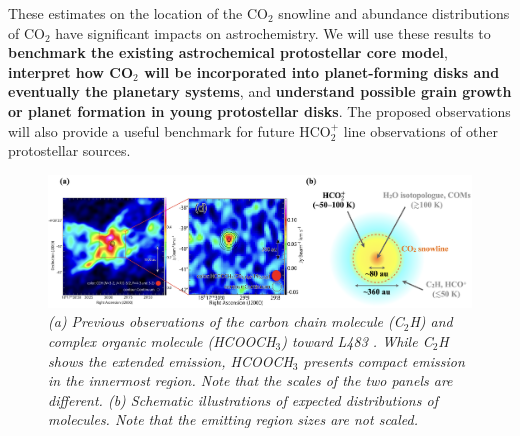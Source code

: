\documentclass[12pt,a4paper]{article}  %
\newcommand{\carbondioxide}{CO$_2$\xspace}
\newcommand{\protonatedcarbondioxide}{HCO$_2^+$\xspace}
\begin{document}

These estimates on the location of the \carbondioxide snowline and abundance distributions of \carbondioxide have significant impacts on astrochemistry. We will use these results to \textbf{benchmark the existing astrochemical protostellar core model}, \textbf{interpret how \carbondioxide will be incorporated into planet-forming disks and eventually the planetary systems}, and \textbf{understand possible grain growth or planet formation in young protostellar disks}. The proposed observations will also provide a useful benchmark for future \protonatedcarbondioxide line observations of other protostellar sources. 

\vspace{-1em}
\begin{figure}[th]
    \centering
    \includegraphics[width=\textwidth]{L483_prevobs_cartoon.png}
    \caption{\emph{(a) Previous observations of the carbon chain molecule (C$_2$H) and complex organic molecule (HCOOCH$_3$) toward L483 \citep{Oya17}. While C$_2$H shows the extended emission, HCOOCH$_3$ presents compact emission in the innermost region. Note that the scales of the two panels are different. (b) Schematic illustrations of expected distributions of molecules. Note that the emitting region sizes are not scaled.}}
    \label{fig:prev_obs}
\end{figure}


%
%
 
\end{document}

